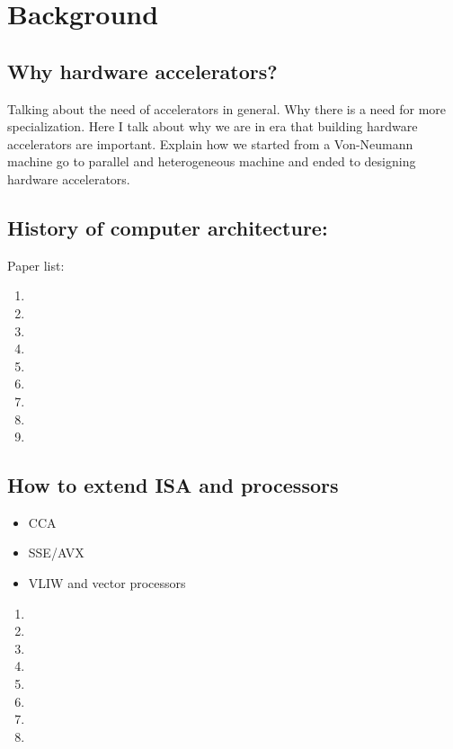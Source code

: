 

\chapter{Background}

\section{Why hardware accelerators?}
Talking about the need of accelerators in general. Why there is a need for more specialization. Here I talk about why we are in era that building hardware accelerators are important. Explain how we started from a Von-Neumann machine go to parallel and heterogeneous machine and ended to designing hardware accelerators.

\section{History of computer architecture:}
Paper list:

\begin{enumerate}
    \item {}
    \item {}
    \item {}
    \item {}
    \item {}
    \item {}
    \item {}
    \item {}
    \item {}
\end{enumerate}

\section{How to extend ISA and processors }

\begin{itemize}
    \item CCA
    \item SSE/AVX
    \item VLIW and vector processors
\end{itemize}

\begin{enumerate}
    \item {}
    \item {}
    \item {}
    \item {}
    \item {}
    \item {}
    \item {}
    \item {}
\end{enumerate}

